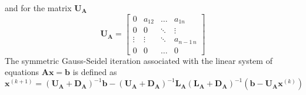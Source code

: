 \documentclass{article}
\newcommand\xkn{\mathbf{x}^{\left(k+1\right)}}
\newcommand\xk{\mathbf{x}^{\left(k\right)}}
\newcommand\DA{\mathbf{D}_{\mathbf{A}}}
\newcommand\LA{\mathbf{L}_{\mathbf{A}}}
\newcommand\UA{\mathbf{U}_{\mathbf{A}}}
\begin{document}
and for the matrix $\UA$
\begin{equation*}
\UA = 
    \begin{bmatrix}
    0 & a_{12} & \dots & a_{1n} \\
    0 & 0 & \ddots & \vdots \\
    \vdots & \vdots &  \ddots& a_{n-1\,n} \\
    0 & 0 & \dots & 0
    \end{bmatrix}
\end{equation*}
The symmetric Gauss-Seidel iteration associated with the linear system of equations $\mathbf{A}\mathbf{x} = \mathbf{b}$ is defined as 
\begin{equation*}
    \xkn = \left(\UA + \DA\right)^{-1}\mathbf{b} - \left(\UA + \DA\right)^{-1}\LA\left(\LA + \DA\right)^{-1}\left(\mathbf{b}- \UA \xk\right)
\end{equation*}
\end{document}
